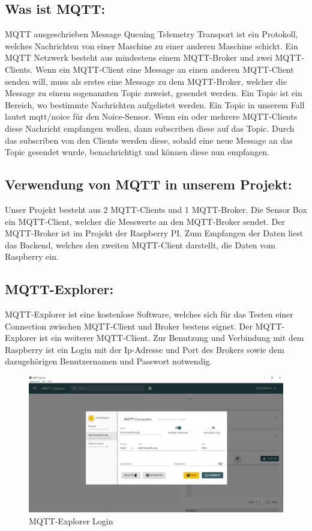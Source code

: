 \subsection{Was ist MQTT:}
MQTT ausgeschrieben Message Queuing  Telemetry Transport ist ein Protokoll, welches Nachrichten von einer Maschine zu einer anderen Maschine schickt. 
Ein MQTT Netzwerk besteht  aus mindestens einem MQTT-Broker und zwei MQTT-Clients. 
Wenn ein MQTT-Client eine Message an einen anderen MQTT-Client senden will, muss als erstes eine Message zu dem MQTT-Broker, welcher die Message zu einem sogenannten Topic zuweist, gesendet werden.
Ein Topic ist ein Bereich, wo bestimmte Nachrichten aufgelistet werden. 
Ein Topic in unserem Fall lautet mqtt/noice für den Noice-Sensor.  
Wenn ein oder mehrere MQTT-Clients diese Nachricht empfangen wollen, dann subscriben diese auf das Topic. 
Durch das subscriben von den Clients werden diese, sobald eine neue Message an das Topic gesendet wurde, benachrichtigt und können diese nun empfangen. 

\subsection {Verwendung von MQTT in unserem Projekt:}
Unser Projekt besteht aus 2 MQTT-Clients und 1 MQTT-Broker. 
Die Sensor Box ein MQTT-Client, welcher die Messwerte an den MQTT-Broker sendet. 
Der MQTT-Broker ist im Projekt der Raspberry PI. 
Zum Empfangen der Daten liest das Backend, welches den zweiten MQTT-Client darstellt, die Daten vom Raspberry ein.

\subsection{MQTT-Explorer:}
MQTT-Explorer ist eine kostenlose Software, welches sich für das Testen einer Connection zwischen MQTT-Client und Broker bestens eignet.
Der MQTT-Explorer ist ein weiterer MQTT-Client.
Zur Benutzung und Verbindung mit dem Raspberry ist ein Login mit der Ip-Adresse und Port des Brokers sowie dem dazugehörigen Benutzernamen und Passwort notwendig.

\begin{figure}[H]
    \centering
    \includegraphics[width=1\textwidth]{pics/MQTTExplorerStartScreen.JPG}
    \caption{MQTT-Explorer Login}
\end{figure}


